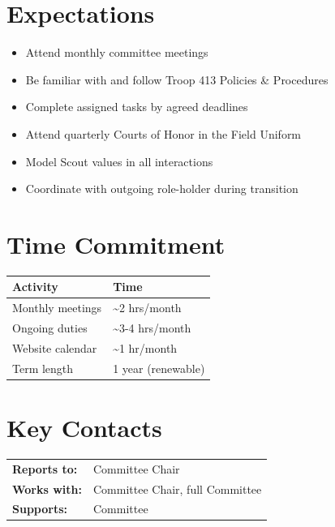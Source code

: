 \documentclass[11pt, letterpaper]{article}
\begin{document}
\hfill
\begin{minipage}[t]{0.48\linewidth}
\raggedright

\section{Expectations}
\begin{itemize}
  \item Attend monthly committee meetings
  \item Be familiar with and follow Troop 413 Policies \& Procedures
  \item Complete assigned tasks by agreed deadlines
  \item Attend quarterly Courts of Honor in the Field Uniform
  \item Model Scout values in all interactions
  \item Coordinate with outgoing role-holder during transition
\end{itemize}

\section{Time Commitment}
\begin{tabular}{@{}p{3.0cm} p{3.8cm}@{}}
  \toprule
  \textbf{Activity} & \textbf{Time} \\
  \midrule
  Monthly meetings  & \textasciitilde{}2 hrs/month \\
  Ongoing duties    & \textasciitilde{}3-4 hrs/month \\
  Website calendar  & \textasciitilde{}1 hr/month \\
  Term length       & 1 year (renewable) \\
  \bottomrule
\end{tabular}

\vspace{1em}

\section{Key Contacts}
\begin{tabular}{@{}p{2.6cm} >{\raggedright\arraybackslash}p{4.2cm}@{}}
  \textbf{Reports to:}  & Committee Chair \\
  \textbf{Works with:}  & Committee Chair, full Committee \\
  \textbf{Supports:}    & Committee \\
\end{tabular}

\end{minipage}
\end{document}
